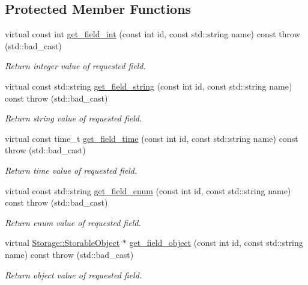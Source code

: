 \subsection*{Protected Member Functions}
\begin{DoxyCompactItemize}
\item 
virtual const int \hyperlink{classSQLiteStorage_aab5d70b4dbe29dbe6e9243a89ee81a89}{get\_\-field\_\-int} (const int id, const std::string name) const   throw (std::bad\_\-cast)
\begin{DoxyCompactList}\small\item\em Return integer value of requested field. \item\end{DoxyCompactList}\item 
virtual const std::string \hyperlink{classSQLiteStorage_a5a68da392583ef992a3aff78cfdacc8a}{get\_\-field\_\-string} (const int id, const std::string name) const   throw (std::bad\_\-cast)
\begin{DoxyCompactList}\small\item\em Return string value of requested field. \item\end{DoxyCompactList}\item 
virtual const time\_\-t \hyperlink{classSQLiteStorage_a5fe9e128b183bea0ee7f046eba38cedd}{get\_\-field\_\-time} (const int id, const std::string name) const   throw (std::bad\_\-cast)
\begin{DoxyCompactList}\small\item\em Return time value of requested field. \item\end{DoxyCompactList}\item 
virtual const std::string \hyperlink{classSQLiteStorage_aef325b647f98c8e5fdb402ec608b403b}{get\_\-field\_\-enum} (const int id, const std::string name) const   throw (std::bad\_\-cast)
\begin{DoxyCompactList}\small\item\em Return enum value of requested field. \item\end{DoxyCompactList}\item 
virtual \hyperlink{classStorage_1_1StorableObject}{Storage::StorableObject} $\ast$ \hyperlink{classSQLiteStorage_adf1189839ae893f3ce4c73c3ee69634d}{get\_\-field\_\-object} (const int id, const std::string name) const   throw (std::bad\_\-cast)
\begin{DoxyCompactList}\small\item\em Return object value of requested field. \item\end{DoxyCompactList}\item 

\end{DoxyCompactItemize}
